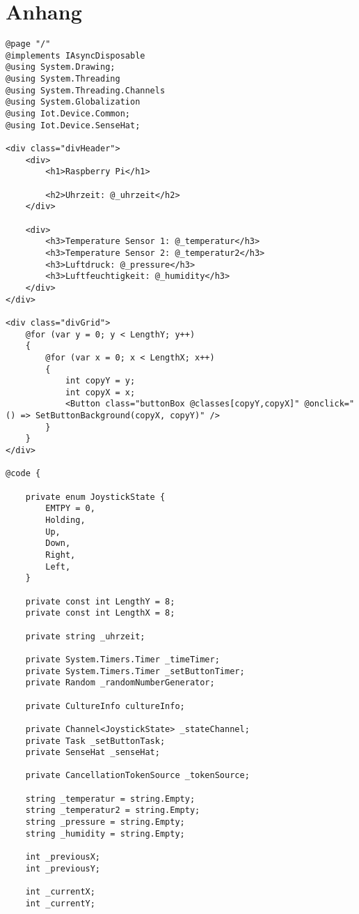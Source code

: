 \chapter{Anhang}
\label{appendix:anhanga}

\begin{lstlisting}[language={[Sharp]C}, caption=Kompletter Demo Code,
	label=lst:DemoCode]
@page "/"
@implements IAsyncDisposable
@using System.Drawing;
@using System.Threading
@using System.Threading.Channels
@using System.Globalization
@using Iot.Device.Common;
@using Iot.Device.SenseHat;

<div class="divHeader">
    <div>
        <h1>Raspberry Pi</h1>

        <h2>Uhrzeit: @_uhrzeit</h2>
    </div>

    <div>
        <h3>Temperature Sensor 1: @_temperatur</h3>
        <h3>Temperature Sensor 2: @_temperatur2</h3>
        <h3>Luftdruck: @_pressure</h3>
        <h3>Luftfeuchtigkeit: @_humidity</h3>
    </div>
</div>

<div class="divGrid">
    @for (var y = 0; y < LengthY; y++)
    {
        @for (var x = 0; x < LengthX; x++)
        {
            int copyY = y;
            int copyX = x;
            <Button class="buttonBox @classes[copyY,copyX]" @onclick="() => SetButtonBackground(copyX, copyY)" />
        }
    }
</div>

@code {

    private enum JoystickState {
        EMTPY = 0,
        Holding,
        Up,
        Down,
        Right,
        Left,
    }

    private const int LengthY = 8;
    private const int LengthX = 8;

    private string _uhrzeit;

    private System.Timers.Timer _timeTimer;
    private System.Timers.Timer _setButtonTimer;
    private Random _randomNumberGenerator;

    private CultureInfo cultureInfo;

    private Channel<JoystickState> _stateChannel;
    private Task _setButtonTask;
    private SenseHat _senseHat;

    private CancellationTokenSource _tokenSource;

    string _temperatur = string.Empty;
    string _temperatur2 = string.Empty;
    string _pressure = string.Empty;
    string _humidity = string.Empty;

    int _previousX;
    int _previousY;

    int _currentX;
    int _currentY;


\end{lstlisting}
